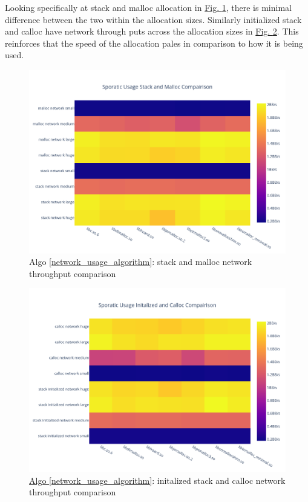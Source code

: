 \documentclass[letterpaper, 10 pt, conference]{ieeeconf}  %
\begin{document}
\pagebreak
Looking specifically at stack and malloc allocation in \hyperref[algo3_stack_malloc_hist]{Fig. \ref{algo3_stack_malloc_hist}}, there is minimal difference between the two within the allocation sizes.
Similarly initialized stack and calloc have network through puts across the allocation sizes in \hyperref[algo3_init_calloc_hist]{Fig. \ref{algo3_init_calloc_hist}}.
This reinforces that the speed of the allocation pales in comparison to how it is being used.

\begin{figure}[tbh!]
  \centering
  \includegraphics[width=\columnwidth]{graphs/sporatic_stack_malloc_hist.png}
  \caption{ Algo \ref{network_usage_algorithm}: stack and malloc network throughput comparison }
  \label{algo3_stack_malloc_hist}
\end{figure}

\begin{figure}[tbh!]
  \centering
  \includegraphics[width=\columnwidth]{graphs/sporatic_init_calloc_hist.png}
  \caption{ \hyperref[network_usage_algorithm]{Algo \ref{network_usage_algorithm}}: initalized stack and calloc network throughput comparison }
  \label{algo3_init_calloc_hist}
\end{figure}
\end{document}
